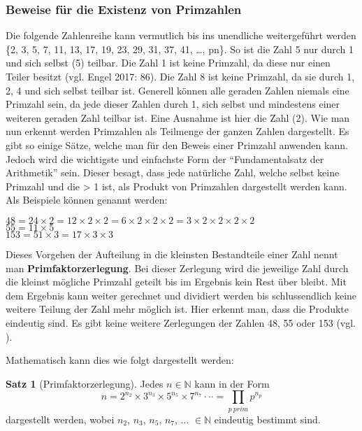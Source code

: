 \documentclass[12pt,a4paper]{article}
\theoremstyle{definition}
\newtheorem{satz}{Satz}[subsection]
\begin{document}
\subsubsection{Beweise für die Existenz von Primzahlen}\label{Beweise für die Existenz von Primzahlen}
Die folgende Zahlenreihe kann vermutlich bis ins unendliche weitergeführt werden \{2, 3, 5, 7, 11, 13, 17, 19, 23, 29, 31, 37, 41, …, pn\}.
So ist die Zahl 5 nur durch 1 und sich selbst (5) teilbar.
Die Zahl 1 ist keine Primzahl, da diese nur einen Teiler besitzt (vgl. Engel 2017: 86).
Die Zahl 8 ist keine Primzahl, da sie durch 1, 2, 4 und sich selbst teilbar ist.
Generell können alle geraden Zahlen niemals eine Primzahl sein, da jede dieser Zahlen durch 1, sich selbst und mindestens einer weiteren geraden Zahl teilbar ist.
Eine Ausnahme ist hier die Zahl (2).
Wie man nun erkennt werden Primzahlen als Teilmenge der ganzen Zahlen dargestellt.
Es gibt so einige Sätze, welche man für den Beweis einer Primzahl anwenden kann.
Jedoch wird die wichtigste und einfachste Form der “Fundamentalsatz der Arithmetik” sein.
Dieser besagt, dass jede natürliche Zahl, welche selbst keine Primzahl und die > 1 ist, als Produkt von Primzahlen dargestellt werden kann.
Als Beispiele können genannt werden:\
\begin{center}$48 = 24\times{2} = 12\times{2}\times{2} = 6\times{2}\times{2}\times{2} = 3\times{2}\times{2}\times{2}\times{2}$\\
$55 = 11\times5$\\
$153 = 51\times{3} = 17\times{3}\times{3}$\end{center}
Dieses Vorgehen der Aufteilung in die kleinsten Bestandteile einer Zahl nennt man \textbf{Primfaktorzerlegung}\label{Primfaktorzerlegung}.
Bei dieser Zerlegung wird die jeweilige Zahl durch die kleinst mögliche Primzahl geteilt bis im Ergebnis kein Rest über bleibt.
Mit dem Ergebnis kann weiter gerechnet und dividiert werden bis schlussendlich keine weitere Teilung der Zahl mehr möglich ist.
Hier erkennt man, dass die Produkte eindeutig sind.
Es gibt keine weitere Zerlegungen der Zahlen 48, 55 oder 153 (vgl. \cite{Hemmerich2020}).

Mathematisch kann dies wie folgt dargestellt werden:
\begin{satz}[Primfaktorzerlegung] Jedes $n \in \mathbb{N}$ kann in der Form
\[n = 2^{n_2} \times 3^{n_3} \times 5^{n_5} \times 7^{n_7} \cdot\cdot\cdot = \prod_{p\ prim} p^{n_p}\]
dargestellt werden, wobei $n_2$, $n_3$, $n_5$, $n_7$, ... $\in \mathbb{N}$ eindeutig bestimmt sind.
\end{satz}
\end{document}
